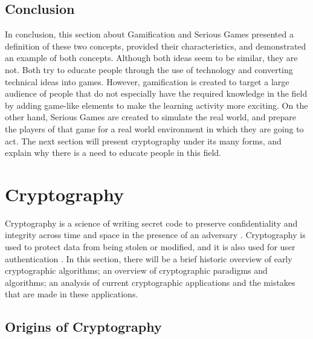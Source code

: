\documentclass{l4proj}
\begin{document}
\subsection{Conclusion}

In conclusion, this section about Gamification and Serious Games presented a definition of these two concepts, provided their characteristics, 
and demonstrated an example of both concepts. Although both ideas seem to be similar, they are not. 
Both try to educate people through the use of technology and converting technical ideas into games.
However, gamification is created to target a large audience of people that do not especially have the required knowledge in the field by adding game-like elements 
to make the learning activity more exciting.
On the other hand, Serious Games are created to simulate the real world, and prepare the players of that game for a real world environment in which they are going to act.
The next section will present cryptography under its many forms, and explain why there is a need to educate people in this field.

\section{Cryptography}

Cryptography is a science of writing secret code to preserve confidentiality and integrity across time and space in the presence of an adversary \citep{kessler_overview_2016} 
\citep{savage_cse_2019}. Cryptography is used to protect data from being stolen or modified, and it is also used for user authentication \citep{kessler_overview_2016}. 
In this section, there will be a brief historic overview of early cryptographic algorithms; an overview of cryptographic paradigms and algorithms; 
an analysis of current cryptographic applications and the mistakes that are made in these applications.

\subsection{Origins of Cryptography}
\end{document}
